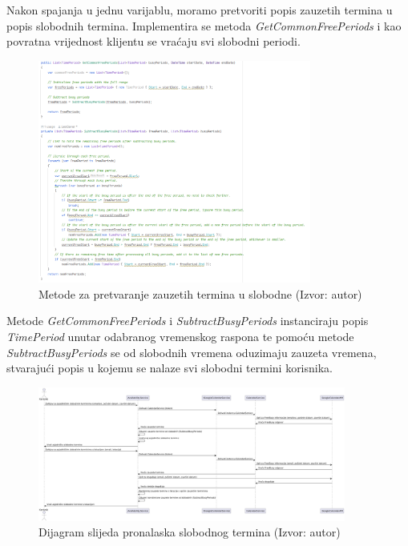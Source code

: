 \documentclass{foi}
\begin{document}
Nakon spajanja u jednu varijablu, moramo pretvoriti popis zauzetih termina u popis slobodnih termina. Implementira se metoda \textit{GetCommonFreePeriods} i kao povratna vrijednost klijentu se vraćaju svi slobodni periodi.
\begin{figure}[H]
    \centering
    \includegraphics[width=0.8\textwidth]{slike/FreePeriods.png}
    \caption{Metode za pretvaranje zauzetih termina u slobodne (Izvor: autor)}
    \label{fig:FreePeriods}
\end{figure}
Metode \textit{GetCommonFreePeriods} i \textit{SubtractBusyPeriods} instanciraju popis \textit{TimePeriod} unutar odabranog vremenskog raspona te pomoću metode \textit{SubtractBusyPeriods} se od slobodnih vremena oduzimaju zauzeta vremena, stvarajući popis u kojemu se nalaze svi slobodni termini korisnika.
\begin{figure}[H]
    \centering
    \includegraphics[width=0.9\textwidth]{slike/dijagramSlijedaFreePeriods.png}
    \caption{Dijagram slijeda pronalaska slobodnog termina (Izvor: autor)}
    \label{fig:dijagramSlijedaFreePeriods}
\end{figure}
\end{document}
